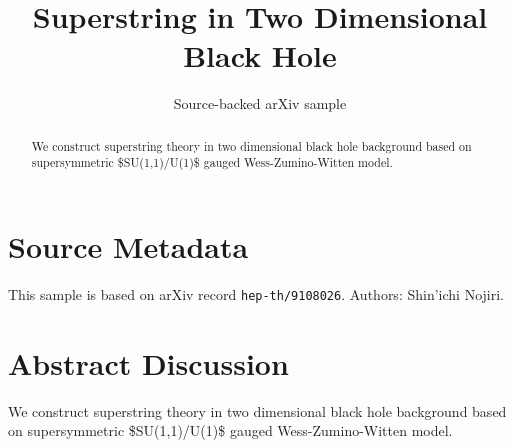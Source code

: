 \documentclass[11pt]{article}
\title{Superstring in Two Dimensional Black Hole}
\author{Source-backed arXiv sample}
\date{}
\begin{document}
\maketitle
\begin{abstract}
We construct superstring theory in two dimensional black hole background based on supersymmetric \$SU(1,1)/U(1)\$ gauged Wess-Zumino-Witten model.
\end{abstract}
\section{Source Metadata}
This sample is based on arXiv record \texttt{hep-th/9108026}. Authors: Shin'ichi Nojiri.
\section{Abstract Discussion}
We construct superstring theory in two dimensional black hole background based on supersymmetric \$SU(1,1)/U(1)\$ gauged Wess-Zumino-Witten model.
\end{document}
